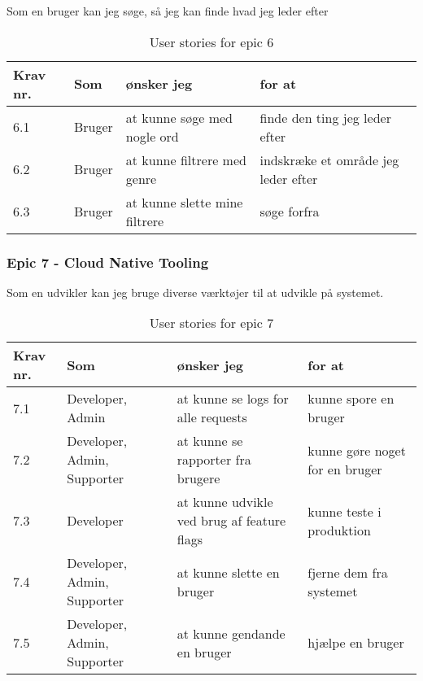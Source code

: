 Som en bruger kan jeg søge, så jeg kan finde hvad jeg leder efter

\begin{table}[H]
    \centering
    \caption{User stories for epic 6}
    \label{tab:us-epic6}
    \begin{tabular}{l|l|l|l}
        \textbf{Krav nr.} & \textbf{Som} & \textbf{ønsker jeg}           & \textbf{for at}                     \\
        \hline
        6.1               & Bruger       & at kunne søge med nogle ord   & finde den ting jeg leder efter      \\
        \hline
        6.2               & Bruger       & at kunne filtrere med genre   & indskræke et område jeg leder efter \\
        \hline
        6.3               & Bruger       & at kunne slette mine filtrere & søge forfra                         \\
    \end{tabular}
\end{table}

\subsubsection{Epic 7 - Cloud Native Tooling}

Som en udvikler kan jeg bruge diverse værktøjer til at udvikle på systemet.

\begin{table}[H]
    \centering
    \caption{User stories for epic 7}
    \label{tab:us-epic7}
    \begin{tabular}{l|l|l|l}
        \textbf{Krav nr.} & \textbf{Som}                & \textbf{ønsker jeg}                        & \textbf{for at}                \\\hline
        7.1               & Developer, Admin            & at kunne se logs for alle requests         & kunne spore en bruger          \\\hline
        7.2               & Developer, Admin, Supporter & at kunne se rapporter fra brugere          & kunne gøre noget for en bruger \\\hline
        7.3               & Developer                   & at kunne udvikle ved brug af feature flags & kunne teste i produktion       \\\hline
        7.4               & Developer, Admin, Supporter & at kunne slette en bruger                  & fjerne dem fra systemet        \\\hline
        7.5               & Developer, Admin, Supporter & at kunne gendande en bruger                & hjælpe en bruger               \\
    \end{tabular}
\end{table}

